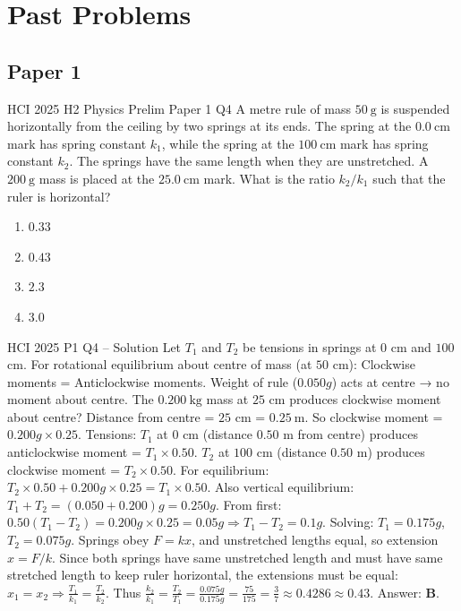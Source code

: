 \documentclass[11pt]{beamer}
\begin{document}
\section{Past Problems}

\subsection{Paper 1}

\begin{frame}[shrink=15]{HCI 2025 H2 Physics Prelim Paper 1 Q4}
A metre rule of mass $50\ \mathrm{g}$ is suspended horizontally from the ceiling by two springs at its ends. The spring at the $0.0\ \mathrm{cm}$ mark has spring constant $k_1$, while the spring at the $100\ \mathrm{cm}$ mark has spring constant $k_2$. The springs have the same length when they are unstretched. A $200\ \mathrm{g}$ mass is placed at the $25.0\ \mathrm{cm}$ mark. What is the ratio $k_2/k_1$ such that the ruler is horizontal?
\begin{enumerate}[A]
    \item $0.33$
    \item $0.43$
    \item $2.3$
    \item $3.0$
\end{enumerate}
\end{frame}

\begin{frame}{HCI 2025 P1 Q4 – Solution}
Let $T_1$ and $T_2$ be tensions in springs at $0$ cm and $100$ cm. For rotational equilibrium about centre of mass (at $50$ cm):
Clockwise moments = Anticlockwise moments.
Weight of rule ($0.050g$) acts at centre → no moment about centre.
The $0.200\ \mathrm{kg}$ mass at $25$ cm produces clockwise moment about centre? Distance from centre = $25$ cm = $0.25\ \mathrm{m}$. So clockwise moment = $0.200g \times 0.25$.
Tensions: $T_1$ at $0$ cm (distance $0.50$ m from centre) produces anticlockwise moment = $T_1 \times 0.50$. $T_2$ at $100$ cm (distance $0.50$ m) produces clockwise moment = $T_2 \times 0.50$.
For equilibrium: $T_2 \times 0.50 + 0.200g \times 0.25 = T_1 \times 0.50$.
Also vertical equilibrium: $T_1 + T_2 = (0.050 + 0.200)g = 0.250g$.
From first: $0.50(T_1 - T_2) = 0.200g \times 0.25 = 0.05g \Rightarrow T_1 - T_2 = 0.1g$.
Solving: $T_1 = 0.175g$, $T_2 = 0.075g$.
Springs obey $F = kx$, and unstretched lengths equal, so extension $x = F/k$. Since both springs have same unstretched length and must have same stretched length to keep ruler horizontal, the extensions must be equal: $x_1 = x_2 \Rightarrow \frac{T_1}{k_1} = \frac{T_2}{k_2}$.
Thus $\frac{k_2}{k_1} = \frac{T_2}{T_1} = \frac{0.075g}{0.175g} = \frac{75}{175} = \frac{3}{7} \approx 0.4286 \approx 0.43$.
Answer: \textbf{B}.
\end{frame}
\end{document}
